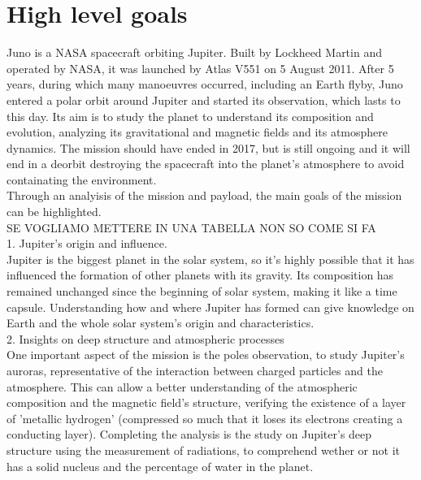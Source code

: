 \section{High level goals}
\label{sec:goals}
Juno is a NASA spacecraft orbiting Jupiter. Built by Lockheed Martin and operated by NASA, it was launched by Atlas V551 on 5 August 2011. After 5 years, during which many manoeuvres occurred, including an Earth flyby, Juno entered a polar orbit around Jupiter and started its observation, which lasts to this day. Its aim is to study the planet to understand its composition and evolution, analyzing its gravitational and magnetic fields and its atmosphere dynamics. The mission should have ended in 2017, but is still ongoing and it will end in a deorbit destroying the spacecraft into the planet's atmosphere to avoid containating the environment. 
\\

Through an analyisis of the mission and payload, the main goals of the mission can be highlighted. \\


SE VOGLIAMO METTERE IN UNA TABELLA NON SO COME SI FA \\

1. Jupiter's origin and influence. \\
Jupiter is the biggest planet in the solar system, so it's highly possible that it has influenced the formation of other planets with its gravity. Its composition has remained unchanged since the beginning of solar system, making it like a time capsule.  Understanding how and where Jupiter has formed can give knowledge on Earth and the whole solar
system’s origin and characteristics. \\

2. Insights on deep structure and atmospheric processes\\
One important aspect of the mission is the poles observation, to study Jupiter's auroras, representative of the interaction between charged particles and the atmosphere. This can allow a better understanding of the atmospheric composition and the magnetic field's structure, verifying the existence of a layer of 'metallic hydrogen' (compressed so much that it loses its electrons creating a conducting layer). Completing the analysis is the study on Jupiter's deep structure using the measurement of radiations, to comprehend wether or not it has a solid nucleus and the percentage of water in the planet.\\

